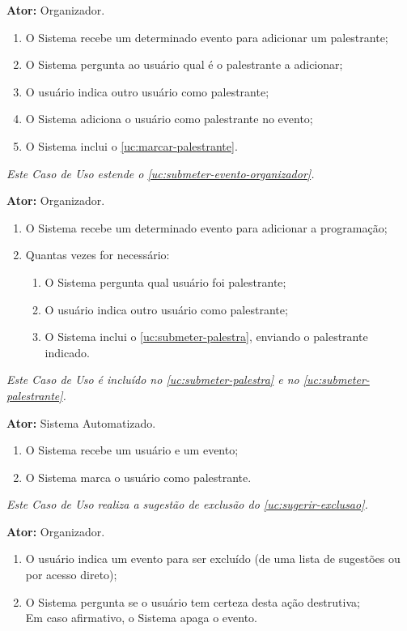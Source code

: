\documentclass[12pt,a4paper,twoside,hyphens,english,brazil]{abntex2}
\begin{document}
{\textbf{Ator:} Organizador.
\begin{enumerate}[itemsep=-1ex,topsep=-1ex]
	\item O Sistema recebe um determinado evento para adicionar um palestrante;
	\item O Sistema pergunta ao usuário qual é o palestrante a adicionar;
	\item O usuário indica outro usuário como palestrante;
	\item O Sistema adiciona o usuário como palestrante no evento;
	\item O Sistema inclui o \ref{uc:marcar-palestrante}.
\end{enumerate}

\emph{Este Caso de Uso estende o \ref{uc:submeter-evento-organizador}.}

\textbf{Ator:} Organizador.
\begin{enumerate}[itemsep=-1ex,topsep=-1ex]
	\item O Sistema recebe um determinado evento para adicionar a programação;
	\item Quantas vezes for necessário:
		\begin{enumerate}
			\item O Sistema pergunta qual usuário foi palestrante;
			\item O usuário indica outro usuário como palestrante;
			\item O Sistema inclui o \ref{uc:submeter-palestra}, enviando o palestrante indicado.
		\end{enumerate}
\end{enumerate}

\emph{Este Caso de Uso é incluído no \ref{uc:submeter-palestra} e no \ref{uc:submeter-palestrante}.}

\textbf{Ator:} Sistema Automatizado.
\begin{enumerate}[itemsep=-1ex,topsep=-1ex]
	\item O Sistema recebe um usuário e um evento;
	\item O Sistema marca o usuário como palestrante.
\end{enumerate}

\emph{Este Caso de Uso realiza a sugestão de exclusão do \ref{uc:sugerir-exclusao}.}

\textbf{Ator:} Organizador.
\begin{enumerate}[itemsep=-1ex,topsep=-1ex]
	\item O usuário indica um evento para ser excluído (de uma lista de sugestões ou por acesso direto);
	\item O Sistema pergunta se o usuário tem certeza desta ação destrutiva;
		\\Em caso afirmativo, o Sistema apaga o evento.
\end{enumerate}

}
\end{document}
